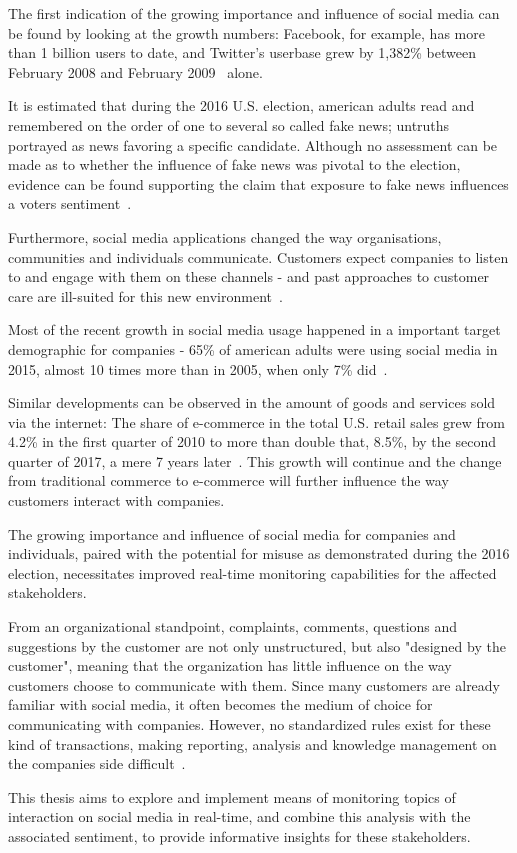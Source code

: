 The first indication of the growing importance and influence of social media can be found by looking at the growth numbers:
Facebook, for example, has more than 1 billion users to date, and Twitter's userbase grew by 1,382\% between February 2008 and February 2009~\cite{mcgiboney2009twitter} alone.
\par

It is estimated that during the 2016 U.S. election, american adults read and remembered on the order of one to several so called fake news;
untruths portrayed as news favoring a specific candidate.
Although no assessment can be made as to whether the influence of fake news was pivotal to the election,
evidence can be found supporting the claim that exposure to fake news influences a voters sentiment~\cite{Allcott2017}.
\par
Furthermore, social media applications changed the way organisations, communities and individuals communicate.
Customers expect companies to listen to and engage with them on these channels - and past approaches to customer care are ill-suited for this new environment~\cite{Kietzmann2011}.
\par
Most of the recent growth in social media usage happened in a important target demographic for companies -
65\% of american adults were using social media in 2015, almost 10 times more than in 2005, when only 7\% did~\cite{Perrin2015}.
\par
Similar developments can be observed in the amount of goods and services sold via the internet:
The share of e-commerce in the total U.S. retail sales grew from 4.2\% in the first quarter of 2010 to more than double that, 8.5\%, by the second quarter of 2017, a mere 7 years later~\cite{statistaECommerceGrowth}.
This growth will continue and the change from traditional commerce to e-commerce
will further influence the way customers interact with companies.
\par
The growing importance and influence of social media for companies and individuals,
paired with the potential for misuse as demonstrated during the 2016 election,
necessitates improved real-time monitoring capabilities for the affected stakeholders.
\par
From an organizational standpoint, complaints, comments, questions and suggestions by the customer are not only unstructured,
but also "designed by the customer", meaning that the organization has little influence on the way customers choose to communicate with them.
Since many customers are already familiar with social media, it often becomes the medium of choice for communicating with companies.
However, no standardized rules exist for these kind of transactions, making reporting, analysis and knowledge management on the companies side difficult~\cite{Culnan2015}.
\par
This thesis aims to explore and implement means of monitoring topics of interaction on social media in real-time,
and combine this analysis with the associated sentiment, to provide informative insights for these stakeholders.

